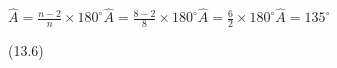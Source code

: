 \begin{table}[H]
{\begin{mdframed}[linewidth=4, leftmargin=40, rightmargin=40]
\begin{exercise}
\begin{enumerate}[noitemsep, label=\textbf{Step}
\textbf{\arabic*}. ]
{\begin{equation}
      \end{equation}
    }{%
    \setlength{\mymathboxwidth}{\columnwidth}
      \addtolength{\mymathboxwidth}{-48pt}
    \par\vspace{12pt}\noindent\begin{minipage}{\columnwidth}
    \parbox[t]{\mymathboxwidth}{\large\begin{math}
    \hat{A}=\frac{n-2}{n}\ensuremath{\times}{180}^{\circ
}\hat{A}=\frac{8-2}{8}\ensuremath{\times}{180}^{\circ
}\hat{A}=\frac{6}{2}\ensuremath{\times}{180}^{\circ }\hat{A}={135}^{\circ
}\end{math}}\hfill
    \parbox[t]{48pt}{\raggedleft 
    (13.6)}
    \end{minipage}\vspace{12pt}\par
    }%
    

\end{enumerate}
        


    \end{exercise}
    \end{mdframed}
    }
    \noindent
  
       

\end{table}

